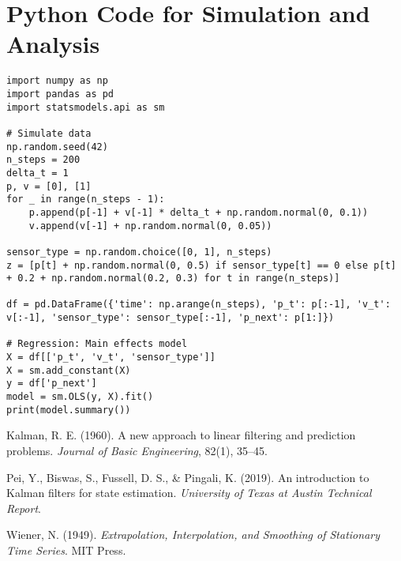 \documentclass[12pt]{article}
\begin{document}
\section{Python Code for Simulation and Analysis}
\label{app:code}

\begin{lstlisting}
import numpy as np
import pandas as pd
import statsmodels.api as sm

# Simulate data
np.random.seed(42)
n_steps = 200
delta_t = 1
p, v = [0], [1]
for _ in range(n_steps - 1):
    p.append(p[-1] + v[-1] * delta_t + np.random.normal(0, 0.1))
    v.append(v[-1] + np.random.normal(0, 0.05))

sensor_type = np.random.choice([0, 1], n_steps)
z = [p[t] + np.random.normal(0, 0.5) if sensor_type[t] == 0 else p[t] + 0.2 + np.random.normal(0.2, 0.3) for t in range(n_steps)]

df = pd.DataFrame({'time': np.arange(n_steps), 'p_t': p[:-1], 'v_t': v[:-1], 'sensor_type': sensor_type[:-1], 'p_next': p[1:]})

# Regression: Main effects model
X = df[['p_t', 'v_t', 'sensor_type']]
X = sm.add_constant(X)
y = df['p_next']
model = sm.OLS(y, X).fit()
print(model.summary())
\end{lstlisting}


\begin{thebibliography}{9}
Kalman, R. E. (1960). A new approach to linear filtering and prediction problems. \textit{Journal of Basic Engineering}, 82(1), 35--45.

Pei, Y., Biswas, S., Fussell, D. S., \& Pingali, K. (2019). An introduction to Kalman filters for state estimation. \textit{University of Texas at Austin Technical Report}.

Wiener, N. (1949). \textit{Extrapolation, Interpolation, and Smoothing of Stationary Time Series}. MIT Press.
\end{thebibliography}
\end{document}
